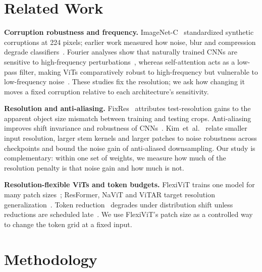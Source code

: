 \documentclass[conference]{IEEEtran}
\begin{document}
\section{Related Work}
\textbf{Corruption robustness and frequency.} ImageNet-C~\cite{hendrycks2019benchmarking} standardized synthetic corruptions at 224 pixels; earlier work measured how noise, blur and compression degrade classifiers~\cite{dodge2016quality}. Fourier analyses show that naturally trained CNNs are sensitive to high-frequency perturbations~\cite{yin2019fourier}, whereas self-attention acts as a low-pass filter, making ViTs comparatively robust to high-frequency but vulnerable to low-frequency noise~\cite{park2022how,shao2022adversarial,kim2024spectral}. These studies fix the resolution; we ask how changing it moves a fixed corruption relative to each architecture's sensitivity.

\textbf{Resolution and anti-aliasing.} FixRes~\cite{touvron2019fixres} attributes test-resolution gains to the apparent object size mismatch between training and testing crops. Anti-aliasing improves shift invariance and robustness of CNNs~\cite{zhang2019shift,vasconcelos2021aliasing}. Kim~et~al.~\cite{kim2025noise} relate smaller input resolution, larger stem kernels and larger patches to noise robustness across checkpoints and bound the noise gain of anti-aliased downsampling. Our study is complementary: within one set of weights, we measure how much of the resolution penalty is that noise gain and how much is not.

\textbf{Resolution-flexible ViTs and token budgets.} FlexiViT trains one model for many patch sizes~\cite{beyer2023flexivit}; ResFormer, NaViT and ViTAR target resolution generalization~\cite{tian2023resformer,dehghani2023navit,fan2024vitar}. Token reduction~\cite{bolya2023tome} degrades under distribution shift unless reductions are scheduled late~\cite{cha2026later}. We use FlexiViT's patch size as a controlled way to change the token grid at a fixed input.

\section{Methodology}
\end{document}
